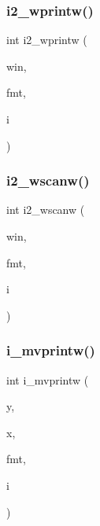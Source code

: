 \mbox{\label{C-macros_8c_acc4cfd26a85fbdf72a2f2f70c54aff7e}} 
\subsubsection{\texorpdfstring{i2\+\_\+wprintw()}{i2\_wprintw()}}
{\footnotesize\ttfamily int i2\+\_\+wprintw (\begin{DoxyParamCaption}\item[{W\+I\+N\+D\+OW $\ast$}]{win,  }\item[{const char $\ast$}]{fmt,  }\item[{short}]{i }\end{DoxyParamCaption})}

\mbox{\label{C-macros_8c_a44593e3cd853674d1c25ad8295a5e7d2}} 
\subsubsection{\texorpdfstring{i2\+\_\+wscanw()}{i2\_wscanw()}}
{\footnotesize\ttfamily int i2\+\_\+wscanw (\begin{DoxyParamCaption}\item[{W\+I\+N\+D\+OW $\ast$}]{win,  }\item[{char $\ast$}]{fmt,  }\item[{short $\ast$}]{i }\end{DoxyParamCaption})}

\mbox{\label{C-macros_8c_aeb5fc07bdb9b6670a11c4d74fd32ccf8}} 
\subsubsection{\texorpdfstring{i\+\_\+mvprintw()}{i\_mvprintw()}}
{\footnotesize\ttfamily int i\+\_\+mvprintw (\begin{DoxyParamCaption}\item[{int}]{y,  }\item[{int}]{x,  }\item[{const char $\ast$}]{fmt,  }\item[{int}]{i }\end{DoxyParamCaption})}

